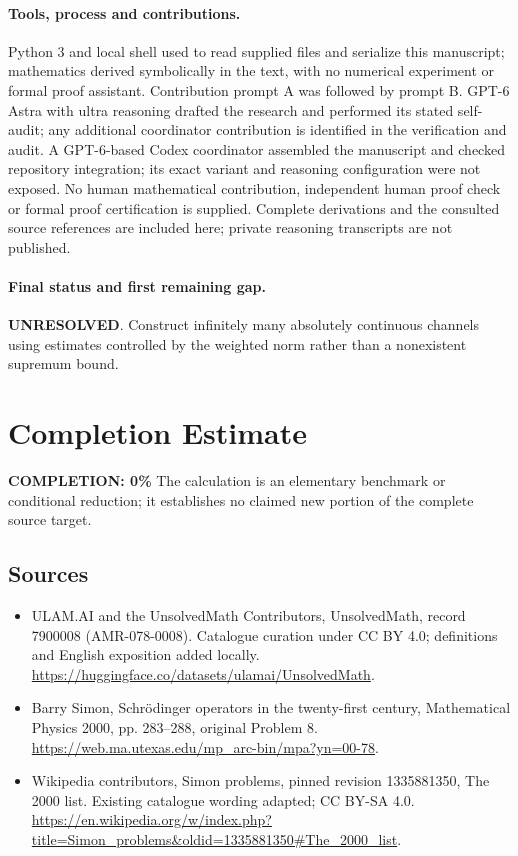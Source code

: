 \documentclass[11pt]{article}
\begin{document}
\paragraph{Tools, process and contributions.}
Python 3 and local shell used to read supplied files and serialize this manuscript; mathematics derived symbolically in the text, with no numerical experiment or formal proof assistant. Contribution prompt A was followed by prompt B. GPT-6 Astra with ultra reasoning drafted the research and performed its stated self-audit; any additional coordinator contribution is identified in the verification and audit. A GPT-6-based Codex coordinator assembled the manuscript and checked repository integration; its exact variant and reasoning configuration were not exposed. No human mathematical contribution, independent human proof check or formal proof certification is supplied. Complete derivations and the consulted source references are included here; private reasoning transcripts are not published.

\paragraph{Final status and first remaining gap.}
\textbf{UNRESOLVED}. Construct infinitely many absolutely continuous channels using estimates controlled by the weighted norm rather than a nonexistent supremum bound.

\section{Completion Estimate}
\noindent\textbf{COMPLETION: 0\%}
The calculation is an elementary benchmark or conditional reduction; it establishes no claimed new portion of the complete source target.

\subsection{Sources}
\begin{itemize}
\item[\hypertarget{source:7900008:1}{S1}] ULAM.AI and the UnsolvedMath Contributors, UnsolvedMath, record 7900008 (AMR-078-0008). Catalogue curation under CC BY 4.0; definitions and English exposition added locally.
\url{https://huggingface.co/datasets/ulamai/UnsolvedMath}.
\item[\hypertarget{source:7900008:2}{S2}] Barry Simon, Schrödinger operators in the twenty-first century, Mathematical Physics 2000, pp. 283–288, original Problem 8.
\url{https://web.ma.utexas.edu/mp_arc-bin/mpa?yn=00-78}.
\item[\hypertarget{source:7900008:3}{S3}] Wikipedia contributors, Simon problems, pinned revision 1335881350, The 2000 list. Existing catalogue wording adapted; CC BY-SA 4.0.
\url{https://en.wikipedia.org/w/index.php?title=Simon_problems&oldid=1335881350#The_2000_list}.
\end{itemize}
\label{end:7900008}
\end{document}
